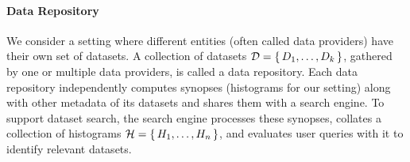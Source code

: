 \paragraph{Data Repository}
We consider a setting where different entities (often called data providers) have their own set of datasets.
A collection of datasets $\mathcal{D}=\left\{\,D_1,\ldots, D_k\,\right\}$, gathered by one or multiple data providers, is called a data repository.
Each data repository independently computes synopses (histograms for our setting) along with other metadata of its datasets and shares them with a search engine.
To support dataset search, the search engine processes these synopses, collates a collection of histograms $\mathcal{H} =\left\{\,H_1,\ldots, H_n\,\right\}$, and evaluates user queries with it to identify relevant datasets.
